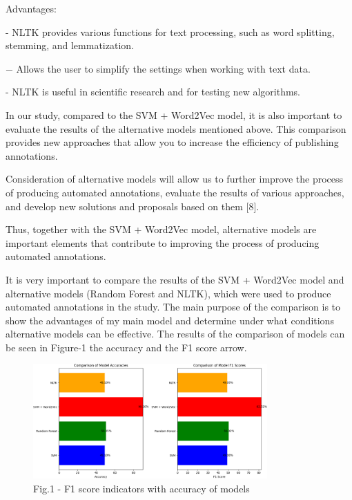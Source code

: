 \begin{multicols}{2}
Advantages:

- NLTK provides various functions for text processing, such as word
splitting, stemming, and lemmatization.

− Allows the user to simplify the settings when working with text data.

- NLTK is useful in scientific research and for testing new algorithms.

In our study, compared to the SVM + Word2Vec model, it is also important
to evaluate the results of the alternative models mentioned above. This
comparison provides new approaches that allow you to increase the
efficiency of publishing annotations.

Consideration of alternative models will allow us to further improve the
process of producing automated annotations, evaluate the results of
various approaches, and develop new solutions and proposals based on
them {[}8{]}.

Thus, together with the SVM + Word2Vec model, alternative models are
important elements that contribute to improving the process of producing
automated annotations.

It is very important to compare the results of the SVM + Word2Vec model
and alternative models (Random Forest and NLTK), which were used to
produce automated annotations in the study. The main purpose of the
comparison is to show the advantages of my main model and determine
under what conditions alternative models can be effective. The results
of the comparison of models can be seen in Figure-1 the accuracy and the
F1 score arrow.
\end{multicols}

\begin{figure}[H]
	\centering
	\includegraphics[width=0.8\textwidth]{media/ict/image22}
	\caption*{Fig.1 - F1 score indicators with accuracy of models}
\end{figure}

